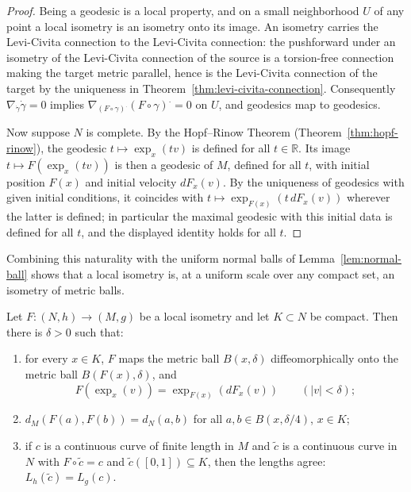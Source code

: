 \begin{proof}
Being a geodesic is a local property, and on a small neighborhood
$U$ of any point a local isometry is an isometry onto its image. An
isometry carries the Levi-Civita connection to the Levi-Civita
connection: the pushforward under an isometry of the Levi-Civita
connection of the source is a torsion-free connection making the
target metric parallel, hence is the Levi-Civita connection of the
target by the uniqueness in
Theorem~\ref{thm:levi-civita-connection}. Consequently
$\nabla_{\dot\gamma}\dot\gamma=0$ implies $\nabla_{(F\circ
\gamma)^{\textstyle .}}(F\circ\gamma)^{\textstyle .}=0$ on $U$, and
geodesics map to geodesics.

Now suppose $N$ is complete. By the Hopf--Rinow Theorem
(Theorem~\ref{thm:hopf-rinow}), the geodesic
$t\mapsto\exp_x(tv)$ is defined for all $t\in\mathbb{R}$. Its image
$t\mapsto F(\exp_x(tv))$ is then a geodesic of $M$, defined for all
$t$, with initial position $F(x)$ and initial velocity $dF_x(v)$. By
the uniqueness of geodesics with given initial conditions, it
coincides with $t\mapsto \exp_{F(x)}(t\,dF_x(v))$ wherever the
latter is defined; in particular the maximal geodesic with this
initial data is defined for all $t$, and the displayed identity
holds for all $t$.
\end{proof}

Combining this naturality with the uniform normal balls of
Lemma~\ref{lem:normal-ball} shows that a local isometry is, at a
uniform scale over any compact set, an isometry of metric balls.

\begin{lemma}
\label{lem:local-isometry-normal-balls}
Let $F\colon(N,h)\to(M,g)$ be a local isometry and let $K\subset
N$ be compact. Then there is $\delta>0$ such that:
\begin{enumerate}
\item for every $x\in K$, $F$ maps the metric ball $B(x,\delta)$
diffeomorphically onto the metric ball $B(F(x),\delta)$, and
$$F\left(\exp_x(v)\right)=\exp_{F(x)}\left(dF_x(v)\right)
\qquad(|v|<\delta);$$
\item $d_M\left(F(a),F(b)\right)=d_N(a,b)$ for all $a,b\in
B(x,\delta/4)$, $x\in K$;
\item if $c$ is a continuous curve of finite length in $M$ and
$\tilde c$ is a continuous curve in $N$ with $F\circ\tilde c=c$
and $\tilde c([0,1])\subseteq K$, then the lengths agree:
$L_h(\tilde c)=L_g(c)$.
\end{enumerate}
\end{lemma}

